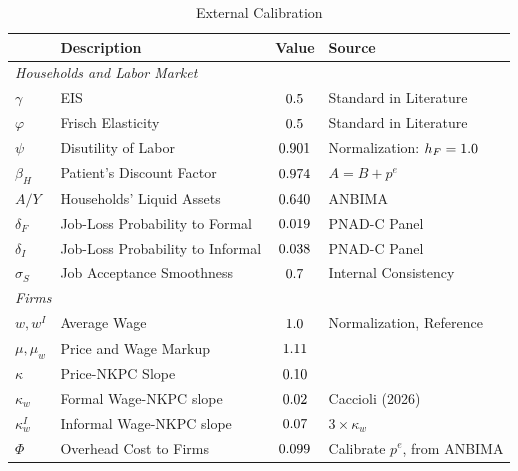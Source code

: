\begin{table}[htbp]
\centering
\caption{External Calibration}
\label{tab:ext_calibration}
\small
\begin{tabular}{llcl}
\toprule
& \textbf{Description} & \textbf{Value} & \textbf{Source} \\
\midrule
\multicolumn{4}{l}{\textit{Households and Labor Market}} \\[2pt]
$\gamma$   & EIS                              & $0.5$      & Standard in Literature \\
$\varphi$  & Frisch Elasticity                & $0.5$   & Standard in Literature \\
$\psi$     & Disutility of Labor              & $0.901$      & Normalization: $h_F = 1.0$ \\
$\beta_H$  & Patient's Discount Factor        & $0.974$ & $A = B + p^e$ \\
$A/Y$      & Households' Liquid Assets        & $0.640$  & ANBIMA \\
$\delta_F$ & Job-Loss Probability to Formal   & $0.019$   & PNAD-C Panel \parencite{osorio2022montagem} \\
$\delta_I$ & Job-Loss Probability to Informal & $0.038$   & PNAD-C Panel \parencite{osorio2022montagem} \\
$\sigma_S$ & Job Acceptance Smoothness        & $0.7$      & Internal Consistency \\
[6pt]

\multicolumn{4}{l}{\textit{Firms}} \\[2pt]
$w, w^I$     & Average Wage              & $1.0$       & Normalization, Reference \\
$\mu, \mu_w$ & Price and Wage Markup     & $1.11$      & \textcite{basu1997returns} \\
$\kappa$     & Price-NKPC Slope          & $0.10$   & \textcite{kaplan2018monetary} \\
$\kappa_w$   & Formal Wage-NKPC slope    & $0.02$  & Caccioli (2026) \\
$\kappa_w^I$ & Informal Wage-NKPC slope  & $0.07$ & $3 \times \kappa_w$ \\
$\Phi$       & Overhead Cost to Firms    & $0.099$     & Calibrate $p^e$, from ANBIMA \\
[6pt]


\end{tabular}
\end{table}
